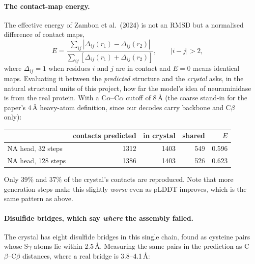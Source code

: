 \documentclass[11pt,a4paper]{article}
\begin{document}
\paragraph{The contact-map energy.} The effective energy of Zambon et al.\
(2024) is not an RMSD but a normalised difference of contact maps,
\begin{equation}
E = \frac{\sum_{ij} \left| \Delta_{ij}(r_1) - \Delta_{ij}(r_2) \right|}
         {\sum_{ij} \left[ \Delta_{ij}(r_1) + \Delta_{ij}(r_2) \right]},
\qquad |i-j| > 2,
\label{eq:energy}
\end{equation}
where $\Delta_{ij}=1$ when residues $i$ and $j$ are in contact and $E=0$ means
identical maps. Evaluating it between the \emph{predicted} structure and the
\emph{crystal} asks, in the natural structural units of this project, how far
the model's idea of neuraminidase is from the real protein. With a
C$\alpha$--C$\alpha$ cutoff of 8\,\AA{} (the coarse stand-in for the paper's
4\,\AA{} heavy-atom definition, since our decodes carry backbone and
C$\beta$ only):

\begin{center}
\begin{tabular}{lrrrr}
\toprule
 & contacts predicted & in crystal & shared & $E$ \\
\midrule
NA head, 32 steps  & 1312 & 1403 & 549 & 0.596 \\
NA head, 128 steps & 1386 & 1403 & 526 & 0.623 \\
\bottomrule
\end{tabular}
\end{center}

Only 39\% and 37\% of the crystal's contacts are reproduced. Note that more
generation steps make this slightly \emph{worse} even as pLDDT improves, which is
the same pattern as above.

\paragraph{Disulfide bridges, which say \emph{where} the assembly failed.} The
crystal has eight disulfide bridges in this single chain, found as cysteine pairs
whose S$\gamma$ atoms lie within 2.5\,\AA. Measuring the same pairs in the
prediction as C$\beta$--C$\beta$ distances, where a real bridge is 3.8--4.1\,\AA:
\end{document}
